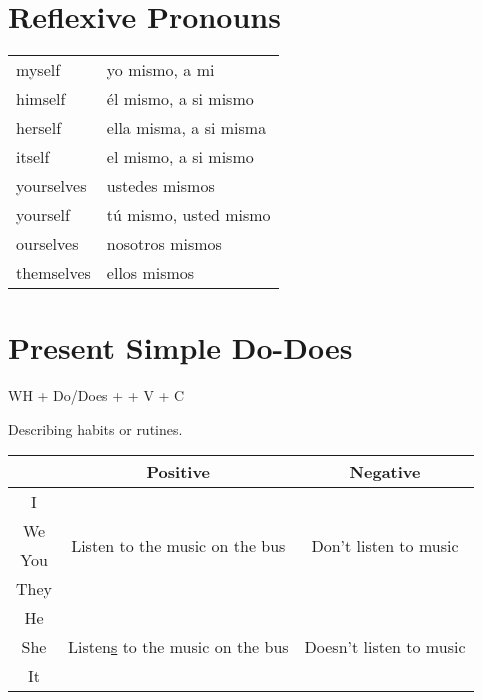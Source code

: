 \documentclass{elegantbook}
\begin{document}
        \section{Reflexive Pronouns}
        \begin{tabular}{|l|l|}
            \hline
            myself&yo mismo, a mi\\
            himself&él mismo, a si mismo\\
            herself&ella misma, a si misma\\
            itself&el mismo, a si mismo\\
            yourselves&ustedes mismos\\
            yourself&tú mismo, usted mismo\\
            ourselves&nosotros mismos\\
            themselves&ellos mismos\\
            \hline
        \end{tabular}
        \section{Present Simple Do-Does}
        \begin{corollary}{}{}
            WH + Do/Does + \dSmiley[2] + V + C
            
        \end{corollary}
        Describing habits or rutines.\\
        \begin{tabular}{|c|c|c|}
            \hline
            &\textbf{Positive}&\textbf{Negative}\\
            \hline
            I&\multirow{4}{10em}{Listen to the music on the bus}&\multirow{4}{10em}{Don't listen to music}\\
            We\\
            You\\
            They\\
            \hline
            He&\multirow{3}{10em}{Listen\underline{s} to the music on the bus}&\multirow{3}{10em}{Doesn't listen to music}\\
            She\\
            It\\
            \hline
        \end{tabular}
\end{document}

